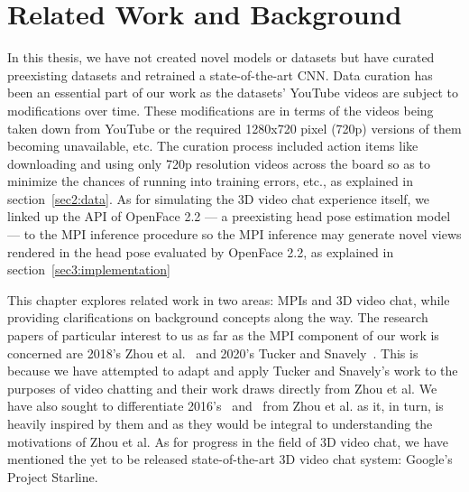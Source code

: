 \chapter{Related Work and Background}\label{ch2:related-work-background}

In this thesis, we have not created novel models or datasets but have curated preexisting datasets and retrained a state-of-the-art CNN. Data curation has been an essential part of our work as the datasets' YouTube videos are subject to modifications over time. These modifications are in terms of the videos being taken down from YouTube or the required 1280x720 pixel (720p) versions of them becoming unavailable, etc. The curation process included action items like downloading and using only 720p resolution videos across the board so as to minimize the chances of running into training errors, etc., as explained in section~\ref{sec2:data}. As for simulating the 3D video chat experience itself, we linked up the API of OpenFace 2.2 --- a preexisting head pose estimation model --- to the MPI inference procedure so the MPI inference may generate novel views rendered in the head pose evaluated by OpenFace 2.2, as explained in section~\ref{sec3:implementation}

This chapter explores related work in two areas: MPIs and 3D video chat, while providing clarifications on background concepts along the way. The research papers of particular interest to us as far as the MPI component of our work is concerned are 2018's Zhou et al.~\cite{zhou2018stereo} and 2020's Tucker and Snavely~\cite{single_view_mpi}. This is because we have attempted to adapt and apply Tucker and Snavely's work to the purposes of video chatting and their work draws directly from Zhou et al. We have also sought to differentiate 2016's~\cite{deep_stereo_2016} and~\cite{kalantari_2016} from Zhou et al. as it, in turn, is heavily inspired by them and as they would be integral to understanding the motivations of Zhou et al. As for progress in the field of 3D video chat, we have mentioned the yet to be released state-of-the-art 3D video chat system: Google's Project Starline.

